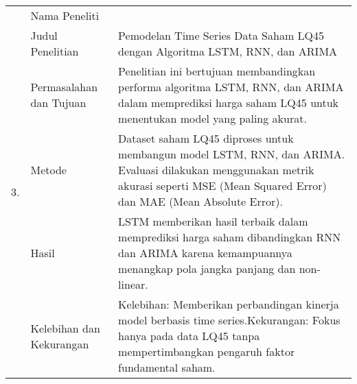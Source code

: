 \begin{center}
\begin{longtable}{| m{1cm} | m{3cm}| p{8cm} |}
    \hline
		\multirow[t]{6}{*}{3.}             & Nama Peneliti                          & \cite{alim2023pemodelan} \\
		\cline{2-3}
		                                   & Judul Penelitian                       & Pemodelan Time Series Data Saham LQ45 dengan Algoritma LSTM, RNN, dan ARIMA \\
		\cline{2-3}
		                                   & Permasalahan dan Tujuan                & Penelitian ini bertujuan membandingkan performa algoritma LSTM, RNN, dan ARIMA dalam memprediksi harga saham LQ45 untuk menentukan model yang paling akurat. \\
		\cline{2-3}
		                                   & Metode                                 & Dataset saham LQ45 diproses untuk membangun model LSTM, RNN, dan ARIMA. Evaluasi dilakukan menggunakan metrik akurasi seperti MSE (Mean Squared Error) dan MAE (Mean Absolute Error). \\
		\cline{2-3}
		                                   & Hasil                                  & LSTM memberikan hasil terbaik dalam memprediksi harga saham dibandingkan RNN dan ARIMA karena kemampuannya menangkap pola jangka panjang dan non-linear. \\
		\cline{2-3}
		                                   & Kelebihan dan Kekurangan               & Kelebihan: Memberikan perbandingan kinerja model berbasis time series.\newline Kekurangan: Fokus hanya pada data LQ45 tanpa mempertimbangkan pengaruh faktor fundamental saham.\\


\end{longtable}
\end{center}
